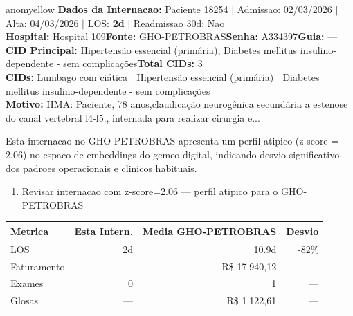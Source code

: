 \documentclass[a4paper,10pt]{article}
\begin{document}
\begin{anomalycard}[Internacao 167580 | GHO-PETROBRAS | MODERADO (z=2.06)]{anomyellow}
\textbf{Dados da Internacao:} Paciente 18254 $\mid$ Admissao: 02/03/2026 $\mid$ Alta: 04/03/2026 $\mid$ LOS: \textbf{2d} $\mid$ Readmissao 30d: Nao\\
\textbf{Hospital:} Hospital 109\quad\textbf{Fonte:} GHO-PETROBRAS\quad\textbf{Senha:} A334397\quad\textbf{Guia:} ---\\
\textbf{CID Principal:} {\small Hipertensão essencial (primária), Diabetes mellitus insulino-dependente - sem complicações}\quad\textbf{Total CIDs:} 3\\

\textbf{CIDs:} {\scriptsize Lumbago com ciática | Hipertensão essencial (primária) | Diabetes mellitus insulino-dependente - sem complicações}\\

\textbf{Motivo:} {\scriptsize HMA: Paciente, 78 anos,claudicação neurogênica secundária a estenose do canal vertebral l4-l5., internada para realizar cirurgia e...}\\

\vspace{2pt}\begin{tcolorbox}[colback=severityred!20,colframe=anomyellow,title={\textbf{Interpretacao de Negocio}},fonttitle=\bfseries\small,left=4pt,right=4pt,top=3pt,bottom=3pt]
{\small Esta internacao no GHO-PETROBRAS apresenta um perfil atipico (z-score = 2.06) no espaco de embeddings do gemeo digital, indicando desvio significativo dos padroes operacionais e clinicos habituais.}
\end{tcolorbox}
\begin{tcolorbox}[colback=severityyellow!30,colframe=anomorange,title={\textbf{Recomendacoes Especificas}},fonttitle=\bfseries\small,left=4pt,right=4pt,top=3pt,bottom=3pt]
\begin{enumerate}[nosep,leftmargin=16pt]
\item {\small Revisar internacao com z-score=2.06 --- perfil atipico para o GHO-PETROBRAS}
\end{enumerate}
\end{tcolorbox}
\begin{center}\begin{tabular}{l r r r}\toprule\textbf{Metrica} & \textbf{Esta Intern.} & \textbf{Media GHO-PETROBRAS} & \textbf{Desvio} \\\midrule
LOS & 2d & 10.9d & -82\% \\
Faturamento & --- & R\$ 17.940,12 & --- \\
Exames & 0 & 1 & --- \\
Glosas & --- & R\$ 1.122,61 & --- \\
\bottomrule\end{tabular}\end{center}


\end{anomalycard}
\end{document}
